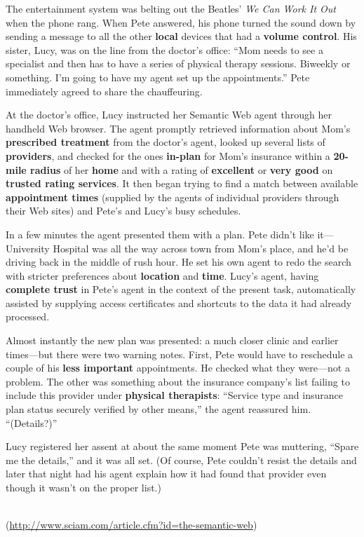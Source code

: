 \documentclass{sepslide-soa-faked} %
\begin{document}
\begin{slide}
\small
\begin{flushleft}
{\sffamily
The entertainment system was belting out the Beatles' \textit{We Can Work It Out} when the phone rang. When Pete answered, his phone turned the sound down by sending a message to all the other \textbf{local} devices that had a \textbf{volume control}. His sister, Lucy, was on the line from the doctor's office: ``Mom needs to see a specialist and then has to have a series of physical therapy sessions. Biweekly or something. I'm going to have my agent set up the appointments.'' Pete immediately agreed to share the chauffeuring.

At the doctor's office, Lucy instructed her Semantic Web agent through her handheld Web browser. The agent promptly retrieved information about Mom's \textbf{prescribed treatment} from the doctor's agent, looked up several lists of \textbf{providers}, and checked for the ones \textbf{in-plan} for Mom's insurance within a \textbf{20-mile radius} of her \textbf{home} and with a rating of \textbf{excellent} or \textbf{very good} on \textbf{trusted rating services}. It then began trying to find a match between available \textbf{appointment times} (supplied by the agents of individual providers through their Web sites) and Pete's and Lucy's busy schedules.

In a few minutes the agent presented them with a plan. Pete didn't like it---University Hospital was all the way across town from Mom's place, and he'd be driving back in the middle of rush hour. He set his own agent to redo the search with stricter preferences about \textbf{location} and \textbf{time}. Lucy's agent, having \textbf{complete trust} in Pete's agent in the context of the present task, automatically assisted by supplying access certificates and shortcuts to the data it had already processed. %

Almost instantly the new plan was presented: a much closer clinic and earlier times---but there were two warning notes. First, Pete would have to reschedule a couple of his \textbf{less important} appointments. He checked what they were---not a problem. The other was something about the insurance company's list failing to include this provider under \textbf{physical therapists}: ``Service type and insurance plan status securely verified by other means,'' the agent reassured him. ``(Details?)''

Lucy registered her assent at about the same moment Pete was muttering, ``Spare me the details,'' and it was all set. (Of course, Pete couldn't resist the details and later that night had his agent explain how it had found that provider even though it wasn't on the proper list.) 
} \medskip \\
(\url{http://www.sciam.com/article.cfm?id=the-semantic-web})
\end{flushleft}
\end{slide}
\end{document}
